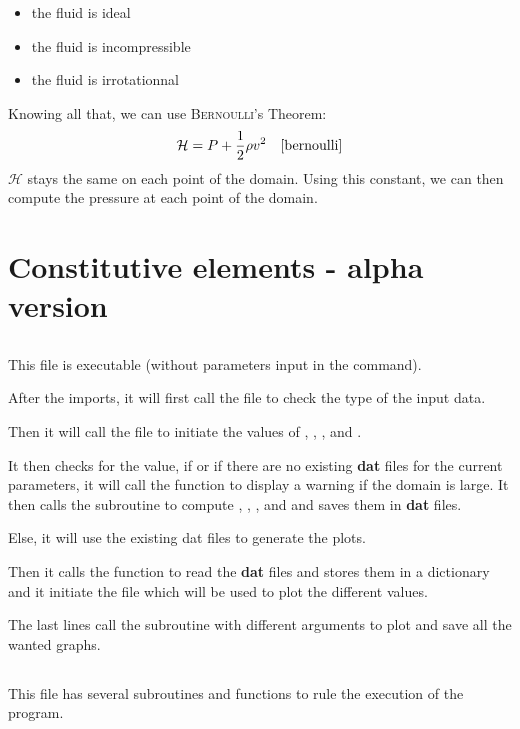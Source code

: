 \begin{itemize}[noitemsep]
      \item the fluid is ideal
      \item the fluid is incompressible
      \item the fluid is irrotationnal
\end{itemize}
Knowing all that, we can use \textsc{Bernoulli}'s Theorem:
\[
      \mathcal{H} = P + \dfrac{1}{2} \rho v^2 \quad \text{\cite{bernoulli}}
\]
$\mathcal{H}$ stays the same on each point of the domain. Using this constant,
we can then compute the pressure at each point of the domain.

\section{Constitutive elements - alpha version}
\subsection{}
This file is executable (without parameters input in the command).

After the imports, it will first call the file  to check the
type of the input data.

Then it will call the file  to initiate
the values of , , ,  and .

It then checks for the  value, if  or if there are no
existing \textbf{dat} files for the current parameters, it will call
the function  to display a warning if the domain is large.
It then calls the subroutine  to compute ,
, ,  and  and saves them in
\textbf{dat} files.

Else, it will use the existing dat files to generate the plots.

Then it calls the function  to read the \textbf{dat} files and
stores them in a dictionary and it initiate the file  which will be
used to plot the different values.

The last lines call the subroutine  with different arguments
to plot and save all the wanted graphs.

\subsection{}
This file has several subroutines and functions to rule the execution of the
program.

